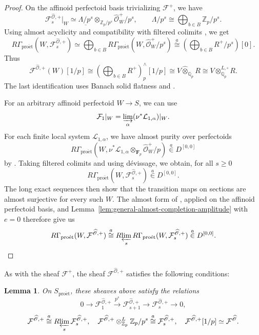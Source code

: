 \documentclass[11pt]{article}
\newtheorem{lemma}[theorem]{Lemma}
\theoremstyle{definition}
\newcommand{\Qp}{\mathbb Q_p}
\newcommand{\Zp}{\mathbb Z_p}
\newcommand{\cF}{\mathcal F}
\newcommand{\cL}{\mathcal L}
\newcommand{\proet}{\mathrm{pro\acute et}}
\newcommand{\acong}{\mathrel{\overset{a}{\cong}}}
\newcommand{\ain}{\mathrel{\overset{a}{\in}}}
\begin{document}
\begin{proof}
On the affinoid perfectoid basis trivializing \(\mathcal F^+\), we have
\[
 \mathcal F_s^{\widehat{\mathscr O},+}|_W
 \simeq\underline{\Lambda/p^s}
       \otimes_{\Zp/p^s}\widehat{\mathscr O}_W^+/p^s,
 \qquad \Lambda/p^s\cong\bigoplus_{b\in B}\Zp/p^s.
\]Using almost acyclicity and compatibility with filtered colimits
\cite[Proposition~3.12 and Lemma~4.10]{ScholzeRigid}, we get
\[
 R\Gamma_{\proet}(W,\mathcal F_s^{\widehat{\mathscr O},+})\simeq\bigoplus_{b\in B}R\Gamma_{\proet}(W,\widehat{\mathscr O}_W^+/p^s)
 \acong\left(\bigoplus_{b\in B}R^+/p^s\right)[0].
\]
Thus 
\[
 \mathcal F^{\widehat{\mathscr O},+}(W)[1/p]
 \cong\left(\bigoplus_{b\in B}R^+\right)^\wedge_p[1/p]
 \cong V\widehat\otimes_{\Qp}R
 \cong V\otimes_{\Qp}^{L,\square}R.
\]
The last identification uses Banach solid flatness and
\cite[Corollary~A.28 and Proposition~A.68]{BoscoDrinfeld}.

For an arbitrary affinoid perfectoid \(W\to S\), we can use
\[
 \mathcal F_1|_W
 =\varinjlim_\alpha(\nu^*\mathcal L_{1,\alpha})|_W.
\]
For each finite local system $\cL_{1,\alpha}$, we have almost purity over perfectoids
\[
 R\Gamma_{\proet}
 (W,\nu^*\mathcal L_{1,\alpha}\otimes_{\mathbf F_p}
                       \widehat{\mathscr O}_W^+/p)
 \ain D^{[0,0]}
\]
by \cite[Lemma~4.12]{ScholzeRigid}.  Taking filtered colimits and using d\'evissage, we obtain, for all $s\ge0$
\[R\Gamma_{\proet}(W,\mathcal F_s^{\widehat{\mathscr O},+})\ain D^{[0,0]}.\]
The long exact sequences then show that the transition maps
on sections are almost surjective for every such \(W\).
The almost form of \cite[Lemma~3.18]{ScholzeRigid}, applied on
the affinoid perfectoid basis, and
Lemma~\ref{lem:general-almost-completion-amplitude} with \(e=0\)
therefore give us
\[
 R\Gamma_{\proet}(W,\mathcal F^{\widehat{\mathscr O},+})
 \acong R\!\varprojlim_s
 R\Gamma_{\proet}(W,\mathcal F_s^{\widehat{\mathscr O},+})
 \ain D^{[0,0]}.
\]
\end{proof}

As with the sheaf $\cF^+$, the sheaf $\cF^{\widehat{\mathscr{O}}, +}$ satisfies the following conditions:
\begin{lemma}%
\label{lem:structural-local-completion}
On \(S_{\proet}\), these sheaves above satisfy the relations
\[
 0\longrightarrow\mathcal F_1^{\widehat{\mathscr O},+}
 \xrightarrow{p^s}\mathcal F_{s+1}^{\widehat{\mathscr O},+}
 \longrightarrow\mathcal F_s^{\widehat{\mathscr O},+}
 \longrightarrow0,
\]
\[\mathcal F^{\widehat{\mathscr O},+}
 \acong R\!\varprojlim_s\mathcal F_s^{\widehat{\mathscr O},+},\quad
 \mathcal F^{\widehat{\mathscr O},+}
 \otimes_{\Zp}^L\Zp/p^s
 \acong\mathcal F_s^{\widehat{\mathscr O},+},\quad
 \mathcal F^{\widehat{\mathscr O},+}[1/p]
 \simeq\mathcal F^{\widehat{\mathscr O}}.\]
\end{lemma}
\end{document}
